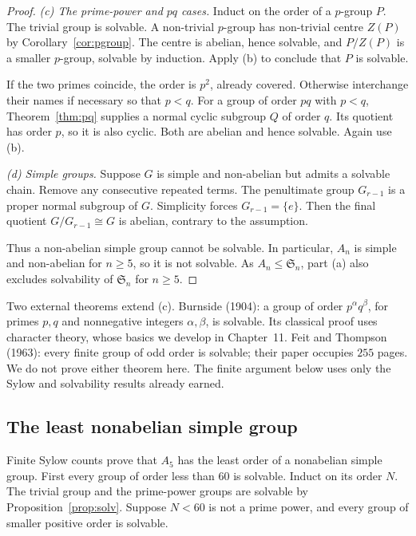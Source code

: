 \begin{proof}
\emph{(c) The prime-power and $pq$ cases.}
Induct on the order of a $p$-group $P$.
The trivial group is solvable. A non-trivial
$p$-group has non-trivial centre $Z(P)$
by Corollary~\ref{cor:pgroup}.
The centre is abelian, hence solvable,
and $P/Z(P)$ is a smaller $p$-group,
solvable by induction. Apply (b) to
conclude that $P$ is solvable.

If the two primes coincide, the order is $p^2$, already covered.
Otherwise interchange their names if necessary so that $p<q$.
For a group of order $pq$ with $p<q$,
Theorem~\ref{thm:pq} supplies a normal
cyclic subgroup $Q$ of order $q$.
Its quotient has order $p$, so it is
also cyclic. Both are abelian and hence
solvable. Again use (b).

\emph{(d) Simple groups.}
Suppose $G$ is simple and non-abelian
but admits a solvable chain. Remove
any consecutive repeated terms.
The penultimate group $G_{r-1}$ is
a proper normal subgroup of $G$.
Simplicity forces $G_{r-1}=\{e\}$.
Then the final quotient
$G/G_{r-1}\cong G$ is abelian,
contrary to the assumption.

Thus a non-abelian simple group
cannot be solvable. In particular,
$A_n$ is simple and non-abelian
for $n\ge5$, so it is not solvable.
As $A_n\le\mathfrak S_n$,
part (a) also excludes solvability
of $\mathfrak S_n$ for $n\ge5$.
\end{proof}

\begin{remark}
Two external theorems extend (c). Burnside (1904): a group of order $p^\alpha q^\beta$, for primes $p,q$ and nonnegative integers $\alpha,\beta$, is solvable. Its classical proof uses character theory, whose basics we develop in Chapter~11. Feit and Thompson (1963): every finite group of odd order is solvable; their paper occupies $255$ pages. We do not prove either theorem here. The finite argument below uses only the Sylow and solvability results already earned.
\end{remark}

\subsection{The least nonabelian simple group}\label{tool:smallest-simple}
Finite Sylow counts prove that $A_5$ has the least order of a nonabelian simple group.
First every group of order less than $60$ is solvable. Induct on its order
$N$. The trivial group and the prime-power groups are solvable by Proposition~\ref{prop:solv}. Suppose $N<60$ is not a prime power, and every group of smaller positive order is solvable.

